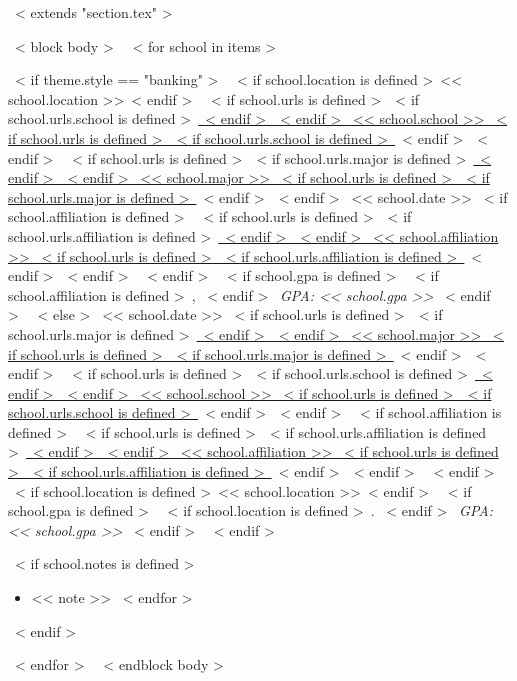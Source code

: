 ~< extends "section.tex" >~

~< block body >~
  ~< for school in items >~
    \begin{samepage}
      \cventry
        ~< if theme.style == "banking" >~
          {~< if school.location is defined >~<< school.location >>~< endif >~}
          {~< if school.urls is defined >~~< if school.urls.school is defined >~\href{<< school.urls.school >>}{~< endif >~~< endif >~%
             << school.school >>%
           ~< if school.urls is defined >~~< if school.urls.school is defined >~}~< endif >~~< endif >~}
          {~< if school.urls is defined >~~< if school.urls.major is defined >~\href{<< school.urls.major >>}{~< endif >~~< endif >~%
             << school.major >>%
           ~< if school.urls is defined >~~< if school.urls.major is defined >~}~< endif >~~< endif >~}
          {<< school.date >>}
          {~< if school.affiliation is defined >~%
             ~< if school.urls is defined >~~< if school.urls.affiliation is defined >~\href{<< school.urls.affiliation >>}{~< endif >~~< endif >~%
               << school.affiliation >>%
             ~< if school.urls is defined >~~< if school.urls.affiliation is defined >~}~< endif >~~< endif >~%
           ~< endif >~%
           ~< if school.gpa is defined >~%
             ~< if school.affiliation is defined >~, ~< endif >~%
             \textit{GPA: << school.gpa >>}%
           ~< endif >~
          }
        ~< else >~
          {<< school.date >>}
          {~< if school.urls is defined >~~< if school.urls.major is defined >~\href{<< school.urls.major >>}{~< endif >~~< endif >~%
             << school.major >>%
           ~< if school.urls is defined >~~< if school.urls.major is defined >~}~< endif >~~< endif >~}
          {~< if school.urls is defined >~~< if school.urls.school is defined >~\href{<< school.urls.school >>}{~< endif >~~< endif >~%
             << school.school >>%
           ~< if school.urls is defined >~~< if school.urls.school is defined >~}~< endif >~~< endif >~}
          {~< if school.affiliation is defined >~%
             ~< if school.urls is defined >~~< if school.urls.affiliation is defined >~\href{<< school.urls.affiliation >>}{~< endif >~~< endif >~%
               << school.affiliation >>%
             ~< if school.urls is defined >~~< if school.urls.affiliation is defined >~}~< endif >~~< endif >~%
           ~< endif >~}
          {~< if school.location is defined >~<< school.location >>~< endif >~%
           ~< if school.gpa is defined >~%
             ~< if school.location is defined >~. ~< endif >~%
             \textit{GPA: << school.gpa >>}%
           ~< endif >~}
        ~< endif >~
        {~< if school.notes is defined >~\begin{itemize}
           ~< for note in school.notes >~
             \item{<< note >>}
           ~< endfor >~
         \end{itemize}~< endif >~}
    \end{samepage}
  ~< endfor >~
~< endblock body >~
